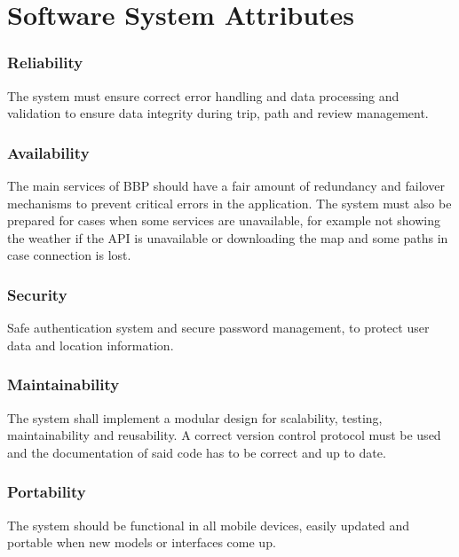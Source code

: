 \newpage
\section{Software System Attributes}
\label{sec:software_system_attributes}%

\subsubsection*{Reliability}
The system must ensure correct error handling and data processing and validation to ensure data integrity during trip, path and review management.

\subsubsection*{Availability}
The main services of BBP should have a fair amount of redundancy and failover mechanisms to prevent critical errors in the application. The system must also be prepared for cases when some services are unavailable, for example not showing the weather if the API is unavailable or downloading the map and some paths in case connection is lost.

\subsubsection*{Security}
Safe authentication system and secure password management, to protect user data and location information.

\subsubsection*{Maintainability}
The system shall implement a modular design for scalability, testing, maintainability and reusability. A correct version control protocol must be used and the documentation of said code has to be correct and up to date.

\subsubsection*{Portability}
The system should be functional in all mobile devices, easily updated and portable when new models or interfaces come up.
